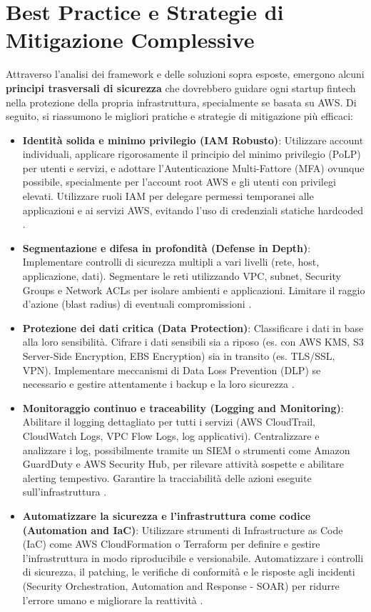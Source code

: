 \section{Best Practice e Strategie di Mitigazione Complessive}
\label{sec:best_practices}
Attraverso l’analisi dei framework e delle soluzioni sopra esposte, emergono alcuni \textbf{principi trasversali di sicurezza} che dovrebbero guidare ogni startup fintech nella protezione della propria infrastruttura, specialmente se basata su AWS. Di seguito, si riassumono le migliori pratiche e strategie di mitigazione più efficaci:
\begin{itemize}
    \item \textbf{Identità solida e minimo privilegio (IAM Robusto)}: Utilizzare account individuali, applicare rigorosamente il principio del minimo privilegio (PoLP) per utenti e servizi, e adottare l'Autenticazione Multi-Fattore (MFA) ovunque possibile, specialmente per l'account root AWS e gli utenti con privilegi elevati. Utilizzare ruoli IAM per delegare permessi temporanei alle applicazioni e ai servizi AWS, evitando l'uso di credenziali statiche hardcoded \cite{awsWellArchitected}.
    \item \textbf{Segmentazione e difesa in profondità (Defense in Depth)}: Implementare controlli di sicurezza multipli a vari livelli (rete, host, applicazione, dati). Segmentare le reti utilizzando VPC, subnet, Security Groups e Network ACLs per isolare ambienti e applicazioni. Limitare il raggio d'azione (blast radius) di eventuali compromissioni \cite{awsWellArchitected}.
    \item \textbf{Protezione dei dati critica (Data Protection)}: Classificare i dati in base alla loro sensibilità. Cifrare i dati sensibili sia a riposo (es. con AWS KMS, S3 Server-Side Encryption, EBS Encryption) sia in transito (es. TLS/SSL, VPN). Implementare meccanismi di Data Loss Prevention (DLP) se necessario e gestire attentamente i backup e la loro sicurezza \cite{awsWellArchitected}.
    \item \textbf{Monitoraggio continuo e traceability (Logging and Monitoring)}: Abilitare il logging dettagliato per tutti i servizi (AWS CloudTrail, CloudWatch Logs, VPC Flow Logs, log applicativi). Centralizzare e analizzare i log, possibilmente tramite un SIEM o strumenti come Amazon GuardDuty e AWS Security Hub, per rilevare attività sospette e abilitare alerting tempestivo. Garantire la tracciabilità delle azioni eseguite sull'infrastruttura \cite{awsWellArchitected}.
    \item \textbf{Automatizzare la sicurezza e l'infrastruttura come codice (Automation and IaC)}: Utilizzare strumenti di Infrastructure as Code (IaC) come AWS CloudFormation o Terraform per definire e gestire l'infrastruttura in modo riproducibile e versionabile. Automatizzare i controlli di sicurezza, il patching, le verifiche di conformità e le risposte agli incidenti (Security Orchestration, Automation and Response - SOAR) per ridurre l'errore umano e migliorare la reattività \cite{awsWellArchitected}.

\end{itemize}
